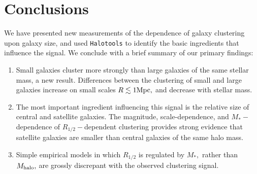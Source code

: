 \documentclass[usenatbib,usegraphicx,letterpaper]{mn2e}
\newcommand{\ben}{\begin{enumerate}}
\newcommand{\een}{\end{enumerate}}
\newcommand{\rhalf}{R_{1/2}}
\newcommand{\mstar}{M_{\ast}}
\newcommand{\mhalo}{M_{\rm halo}}
\newcommand{\rvir}{R_{\rm vir}}
\newcommand{\rmpeak}{R_{\rm M_{peak}}}
\newcommand{\rspeak}{{R_{\rm s,}}_{\rm M_{peak}}}
\newcommand{\mpc}{{\rm Mpc}}
\begin{document}


\section{Conclusions}
\label{sec:conclusion}

We have presented new measurements of the dependence of galaxy clustering upon galaxy size, and used {\tt Halotools} to identify the basic ingredients that influence the signal. We conclude with a brief summary of our primary findings:

\ben
\item Small galaxies cluster more strongly than large galaxies of the same stellar mass, a new result. Differences between the clustering of small and large galaxies increase on small scales $R\lesssim1\mpc,$ and decrease with stellar mass.
\item The most important ingredient influencing this signal is the relative size of central and satellite galaxies. The magnitude, scale-dependence, and $\mstar-$dependence of $\rhalf-$dependent clustering provides strong evidence that satellite galaxies are smaller than central galaxies of the same halo mass.
\item Simple empirical models in which $\rhalf$ is regulated by $\mstar,$ rather than $\mhalo,$ are grossly discrepant with the observed clustering signal.
\een
\end{document}
